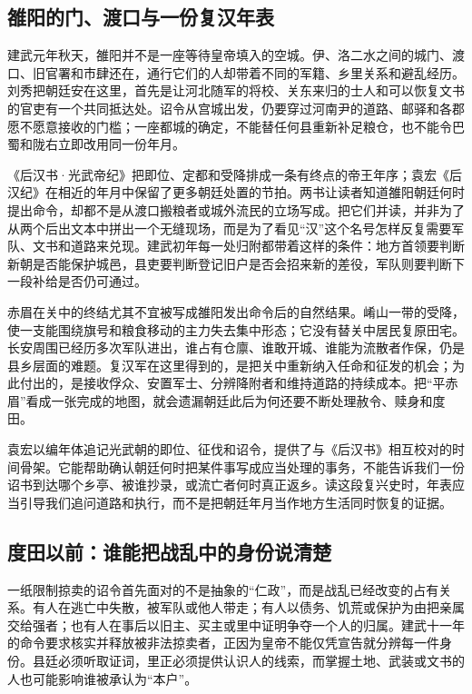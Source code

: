 \subsection{雒阳的门、渡口与一份复汉年表}

建武元年秋天，雒阳并不是一座等待皇帝填入的空城。伊、洛二水之间的城门、渡口、旧官署和市肆还在，通行它们的人却带着不同的军籍、乡里关系和避乱经历。刘秀把朝廷安在这里，首先是让河北随军的将校、关东来归的士人和可以恢复文书的官吏有一个共同抵达处。诏令从宫城出发，仍要穿过河南尹的道路、邮驿和各郡愿不愿意接收的门槛；一座都城的确定，不能替任何县重新补足粮仓，也不能令巴蜀和陇右立即改用同一份年月。

《后汉书·光武帝纪》把即位、定都和受降排成一条有终点的帝王年序；袁宏《后汉纪》在相近的年月中保留了更多朝廷处置的节拍。两书让读者知道雒阳朝廷何时提出命令，却都不是从渡口搬粮者或城外流民的立场写成。把它们并读，并非为了从两个后出文本中拼出一个无缝现场，而是为了看见“汉”这个名号怎样反复需要军队、文书和道路来兑现。建武初年每一处归附都带着这样的条件：地方首领要判断新朝是否能保护城邑，县吏要判断登记旧户是否会招来新的差役，军队则要判断下一段补给是否仍可通过。

赤眉在关中的终结尤其不宜被写成雒阳发出命令后的自然结果。崤山一带的受降，使一支能围绕旗号和粮食移动的主力失去集中形态；它没有替关中居民复原田宅。长安周围已经历多次军队进出，谁占有仓廪、谁敢开城、谁能为流散者作保，仍是县乡层面的难题。复汉军在这里得到的，是把关中重新纳入任命和征发的机会；为此付出的，是接收俘众、安置军士、分辨降附者和维持道路的持续成本。把“平赤眉”看成一张完成的地图，就会遗漏朝廷此后为何还要不断处理赦令、赎身和度田。

\begin{textwindow}
袁宏以编年体追记光武朝的即位、征伐和诏令，提供了与《后汉书》相互校对的时间骨架。它能帮助确认朝廷何时把某件事写成应当处理的事务，不能告诉我们一份诏书到达哪个乡亭、被谁抄录，或流亡者何时真正返乡。读这段复兴史时，年表应当引导我们追问道路和执行，而不是把朝廷年月当作地方生活同时恢复的证据。
\end{textwindow}

\subsection{度田以前：谁能把战乱中的身份说清楚}

一纸限制掠卖的诏令首先面对的不是抽象的“仁政”，而是战乱已经改变的占有关系。有人在逃亡中失散，被军队或他人带走；有人以债务、饥荒或保护为由把亲属交给强者；也有人在事后以旧主、买主或里中证明争夺一个人的归属。建武十一年的命令要求核实并释放被非法掠卖者，正因为皇帝不能仅凭宣告就分辨每一件身份。县廷必须听取证词，里正必须提供认识人的线索，而掌握土地、武装或文书的人也可能影响谁被承认为“本户”。

